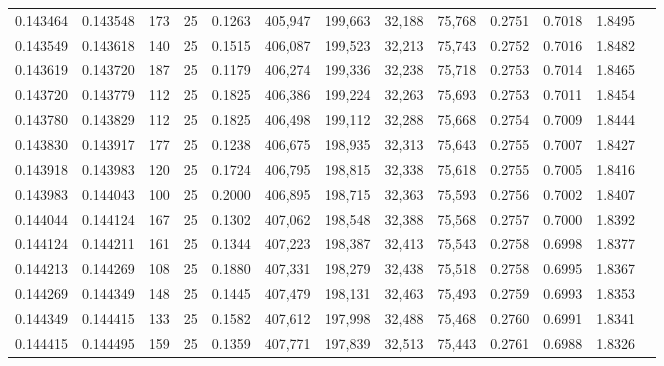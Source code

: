 \begin{tabular}{rrrrrrrrrrrrr}
0.143464 & 0.143548 &   173 &  25 &                                     0.1263 & 405,947 & 199,663 &  32,188 &  75,768 & 0.2751 & 0.7018 & 1.8495 \\
0.143549 & 0.143618 &   140 &  25 &                                     0.1515 & 406,087 & 199,523 &  32,213 &  75,743 & 0.2752 & 0.7016 & 1.8482 \\
0.143619 & 0.143720 &   187 &  25 &                                     0.1179 & 406,274 & 199,336 &  32,238 &  75,718 & 0.2753 & 0.7014 & 1.8465 \\
0.143720 & 0.143779 &   112 &  25 &                                     0.1825 & 406,386 & 199,224 &  32,263 &  75,693 & 0.2753 & 0.7011 & 1.8454 \\
0.143780 & 0.143829 &   112 &  25 &                                     0.1825 & 406,498 & 199,112 &  32,288 &  75,668 & 0.2754 & 0.7009 & 1.8444 \\
0.143830 & 0.143917 &   177 &  25 &                                     0.1238 & 406,675 & 198,935 &  32,313 &  75,643 & 0.2755 & 0.7007 & 1.8427 \\
0.143918 & 0.143983 &   120 &  25 &                                     0.1724 & 406,795 & 198,815 &  32,338 &  75,618 & 0.2755 & 0.7005 & 1.8416 \\
0.143983 & 0.144043 &   100 &  25 &                                     0.2000 & 406,895 & 198,715 &  32,363 &  75,593 & 0.2756 & 0.7002 & 1.8407 \\
0.144044 & 0.144124 &   167 &  25 &                                     0.1302 & 407,062 & 198,548 &  32,388 &  75,568 & 0.2757 & 0.7000 & 1.8392 \\
0.144124 & 0.144211 &   161 &  25 &                                     0.1344 & 407,223 & 198,387 &  32,413 &  75,543 & 0.2758 & 0.6998 & 1.8377 \\
0.144213 & 0.144269 &   108 &  25 &                                     0.1880 & 407,331 & 198,279 &  32,438 &  75,518 & 0.2758 & 0.6995 & 1.8367 \\
0.144269 & 0.144349 &   148 &  25 &                                     0.1445 & 407,479 & 198,131 &  32,463 &  75,493 & 0.2759 & 0.6993 & 1.8353 \\
0.144349 & 0.144415 &   133 &  25 &                                     0.1582 & 407,612 & 197,998 &  32,488 &  75,468 & 0.2760 & 0.6991 & 1.8341 \\
0.144415 & 0.144495 &   159 &  25 &                                     0.1359 & 407,771 & 197,839 &  32,513 &  75,443 & 0.2761 & 0.6988 & 1.8326 \\

\end{tabular}

